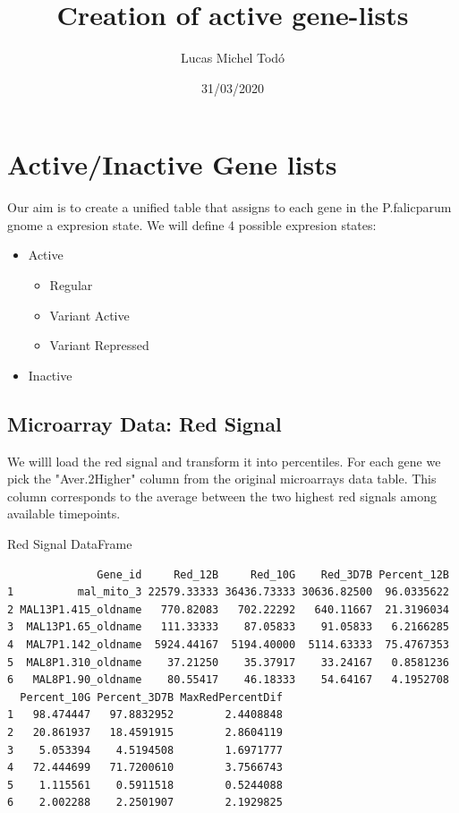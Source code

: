 \documentclass[11pt]{article}
\author{Lucas Michel Todó}
\date{31/03/2020}
\title{Creation of active gene-lists}
\begin{document}
\maketitle
\tableofcontents


\section{Active/Inactive Gene lists}
\label{sec:org3f14d4c}
Our aim is to create a unified table that assigns to each gene in the P.falicparum gnome a expresion state.
We will define 4 possible expresion states:
\begin{itemize}
\item Active
\begin{itemize}
\item Regular
\item Variant Active
\item Variant Repressed
\end{itemize}
\item Inactive
\end{itemize}

\subsection{Microarray Data: Red Signal}
\label{sec:org01c354a}
We willl load the red signal and transform it into percentiles. For each gene we pick the "Aver.2Higher" column from the original microarrays data table. This column corresponds to the average between the two highest red signals among available timepoints.

Red Signal DataFrame
\begin{verbatim}
              Gene_id     Red_12B     Red_10G    Red_3D7B Percent_12B
1          mal_mito_3 22579.33333 36436.73333 30636.82500  96.0335622
2 MAL13P1.415_oldname   770.82083   702.22292   640.11667  21.3196034
3  MAL13P1.65_oldname   111.33333    87.05833    91.05833   6.2166285
4  MAL7P1.142_oldname  5924.44167  5194.40000  5114.63333  75.4767353
5  MAL8P1.310_oldname    37.21250    35.37917    33.24167   0.8581236
6   MAL8P1.90_oldname    80.55417    46.18333    54.64167   4.1952708
  Percent_10G Percent_3D7B MaxRedPercentDif
1   98.474447   97.8832952        2.4408848
2   20.861937   18.4591915        2.8604119
3    5.053394    4.5194508        1.6971777
4   72.444699   71.7200610        3.7566743
5    1.115561    0.5911518        0.5244088
6    2.002288    2.2501907        2.1929825
\end{verbatim}
\end{document}
